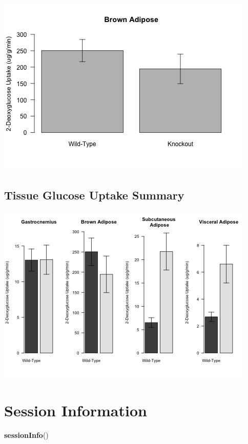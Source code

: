 \documentclass[]{article}
\newenvironment{Shaded}{\begin{snugshade}}{\end{snugshade}}
\newcommand{\KeywordTok}[1]{\textcolor[rgb]{0.13,0.29,0.53}{\textbf{#1}}}
\newcommand{\NormalTok}[1]{#1}
\begin{document}
\includegraphics{figures/bat-1.png}

\subsection{Tissue Glucose Uptake
Summary}\label{tissue-glucose-uptake-summary}

\includegraphics{figures/tissue-glucose-uptake-summary-1.png}

\section{Session Information}\label{session-information}

\begin{Shaded}
\begin{Highlighting}[]
\KeywordTok{sessionInfo}\NormalTok{()}
\end{Highlighting}
\end{Shaded}
\end{document}
